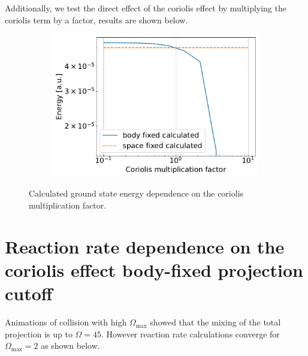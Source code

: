 \documentclass{article}
\begin{document}
    Additionally, we test the direct effect of the coriolis effect by multiplying
    the coriolis term by a factor, results are shown below.

    \begin{figure}[H]
        \centering
        \begin{subfigure}{.7\linewidth}
            \centering
            \includegraphics[width=\linewidth]{coriolis_convergence_test.pdf}
        \end{subfigure} 
        \caption{Calculated ground state energy dependence on the coriolis multiplication factor.}
    \end{figure}

\section{Reaction rate dependence on the coriolis effect body-fixed projection cutoff}
    Animations of collision with high $\Omega_\text{max}$ showed that the mixing of 
    the total projection is up to $\Omega = 45$. However reaction rate calculations converge 
    for $\Omega_\text{max} = 2$ as shown below.
\end{document}
